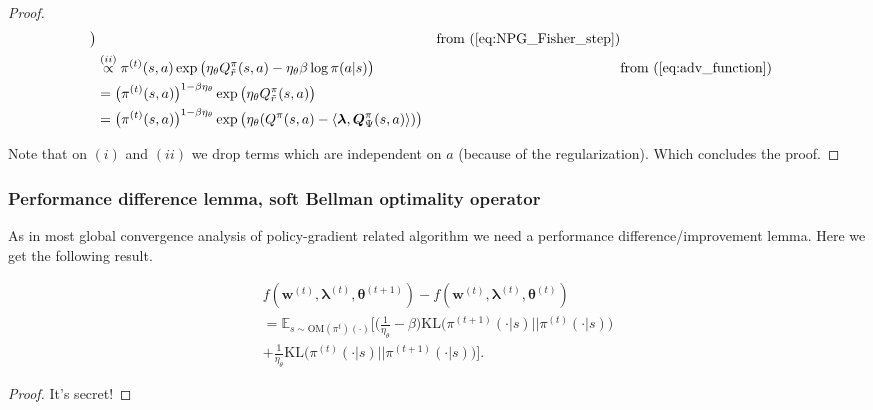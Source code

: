 \begin{proof}
\begin{align*}
    \big) && \text{from (\ref{eq:NPG_Fisher_step})} \\
    &\stackrel{(ii)}{\propto} \pi^{(t)}(s,a) \exp\big(
        \eta_\theta Q_{\tilde{r}}^\pi(s,a) 
        - \eta_\theta \beta \log \pi(a|s) 
    \big) && \text{from (\ref{eq:adv_function})} \\
    &= \bigl( \pi^{(t)}(s,a) \bigr)^{1-\beta \eta_\theta } \exp\big(
        \eta_\theta 
        Q_{\tilde{r}}^\pi(s,a) 
    \big) \\
    &= \bigl( \pi^{(t)}(s,a) \bigr)^{1-\beta \eta_\theta } \exp\big(
        \eta_\theta 
        (Q^\pi(s,a) - \langle \bm{\lambda}, \bm{Q}_\Psi^\pi(s,a) \rangle )
    \big) && \\
\end{align*}

Note that on $(i)$ and $(ii)$ we drop terms which are independent on $a$ (because of the regularization). Which concludes the proof.
\end{proof}

\subsubsection{Performance difference lemma, soft Bellman optimality operator}
As in most global convergence analysis of policy-gradient related algorithm we need a performance difference/improvement lemma. Here we get the following result.
\begin{lemma}
    \begin{align*}
    f(\bm{w}^{(t)},\bm{\lambda}^{(t)},\bm{\theta}^{(t+1)}) 
    - f(\bm{w}^{(t)},\bm{\lambda}^{(t)},\bm{\theta}^{(t)}) \\
   = \mathbb{E}_{s \sim \text{OM}(\pi^{t})(\cdot)}
   \Bigg[ 
        \Big(
            \frac{1}{\eta_\theta} - \beta
        \Big)\text{KL}
        \Big(
            \pi^{(t+1)}(\cdot|s)
            \Big|\Big|
            \pi^{(t)}(\cdot|s)
        \Big)
        \\+ \frac{1}{\eta_\theta}
        \text{KL}
        \Big(
            \pi^{(t)}(\cdot|s)
            \Big|\Big|
            \pi^{(t+1)}(\cdot|s)
        \Big)
    \Bigg].
    \end{align*}
\end{lemma}

\begin{proof}
    It's secret! 
\end{proof}


